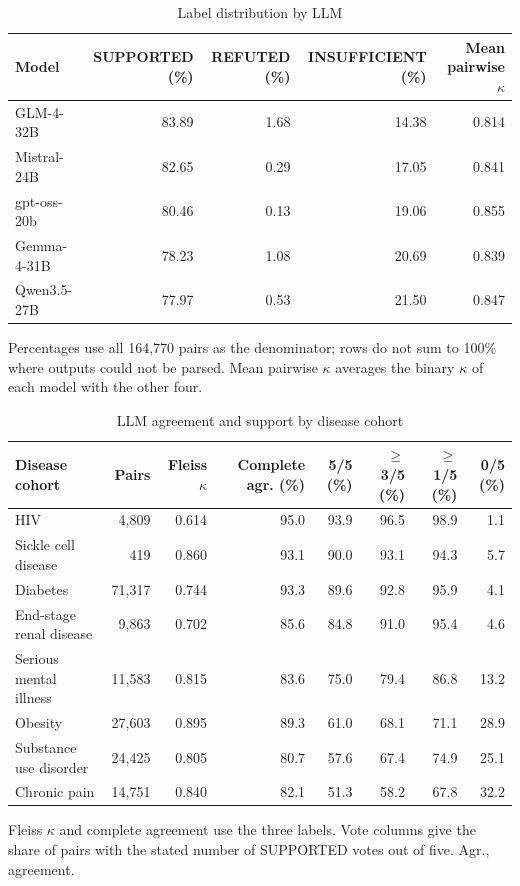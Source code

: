 \documentclass[unnumsec,webpdf,contemporary,large]{oup-authoring-template}
\begin{document}
\begin{table}[H]
\caption{Label distribution by LLM}
\label{tab:s_llm_models}
\centering
\small
\begin{tabular}{lrrrr}
\toprule
Model & SUPPORTED (\%) & REFUTED (\%) & INSUFFICIENT (\%) & Mean pairwise \(\kappa\) \\
\midrule
GLM-4-32B & 83.89 & 1.68 & 14.38 & 0.814 \\
Mistral-24B & 82.65 & 0.29 & 17.05 & 0.841 \\
gpt-oss-20b & 80.46 & 0.13 & 19.06 & 0.855 \\
Gemma-4-31B & 78.23 & 1.08 & 20.69 & 0.839 \\
Qwen3.5-27B & 77.97 & 0.53 & 21.50 & 0.847 \\
\bottomrule
\end{tabular}
\begin{tablenotes}
\item Percentages use all 164,770 pairs as the denominator; rows do not sum to 100\% where outputs could not be parsed. Mean pairwise \(\kappa\) averages the binary \(\kappa\) of each model with the other four.
\end{tablenotes}
\end{table}

\begin{table}[H]
\caption{LLM agreement and support by disease cohort}
\label{tab:s_llm_disease}
\centering
\small
\begin{tabular}{lrrrrrrr}
\toprule
Disease cohort & Pairs & Fleiss \(\kappa\) & Complete agr. (\%) & 5/5 (\%) & \(\geq\)3/5 (\%) & \(\geq\)1/5 (\%) & 0/5 (\%) \\
\midrule
HIV & 4,809 & 0.614 & 95.0 & 93.9 & 96.5 & 98.9 & 1.1 \\
Sickle cell disease & 419 & 0.860 & 93.1 & 90.0 & 93.1 & 94.3 & 5.7 \\
Diabetes & 71,317 & 0.744 & 93.3 & 89.6 & 92.8 & 95.9 & 4.1 \\
End-stage renal disease & 9,863 & 0.702 & 85.6 & 84.8 & 91.0 & 95.4 & 4.6 \\
Serious mental illness & 11,583 & 0.815 & 83.6 & 75.0 & 79.4 & 86.8 & 13.2 \\
Obesity & 27,603 & 0.895 & 89.3 & 61.0 & 68.1 & 71.1 & 28.9 \\
Substance use disorder & 24,425 & 0.805 & 80.7 & 57.6 & 67.4 & 74.9 & 25.1 \\
Chronic pain & 14,751 & 0.840 & 82.1 & 51.3 & 58.2 & 67.8 & 32.2 \\
\bottomrule
\end{tabular}
\begin{tablenotes}
\item Fleiss \(\kappa\) and complete agreement use the three labels. Vote columns give the share of pairs with the stated number of SUPPORTED votes out of five. Agr., agreement.
\end{tablenotes}
\end{table}
\end{document}
